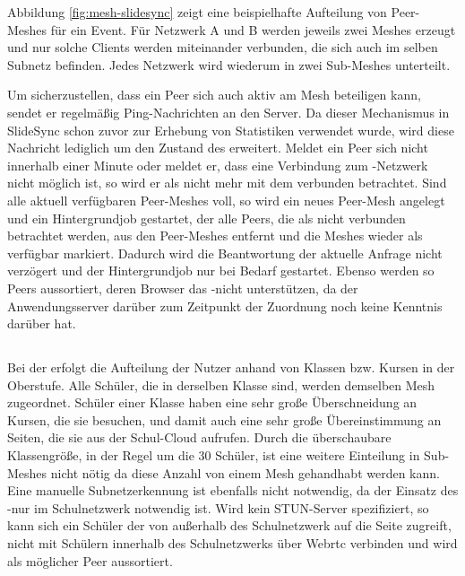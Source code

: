 Abbildung \ref{fig:mesh-slidesync} zeigt eine beispielhafte Aufteilung von Peer-Meshes für ein Event. Für Netzwerk A und B werden jeweils zwei Meshes erzeugt und nur solche Clients werden miteinander verbunden, die sich auch im selben Subnetz befinden. Jedes Netzwerk wird wiederum in zwei Sub-Meshes unterteilt.

Um sicherzustellen, dass ein Peer sich auch aktiv am Mesh beteiligen kann, sendet er regelmäßig Ping-Nachrichten an den Server. Da dieser Mechanismus in SlideSync schon zuvor zur Erhebung von Statistiken verwendet wurde, wird diese Nachricht lediglich um den Zustand des \cdns erweitert. Meldet ein Peer sich nicht innerhalb einer Minute oder meldet er, dass eine Verbindung zum \pTp-Netzwerk nicht möglich ist, so wird er als nicht mehr mit dem \pTp \cdn verbunden betrachtet. Sind alle aktuell verfügbaren Peer-Meshes voll, so wird ein neues Peer-Mesh angelegt und ein Hintergrundjob gestartet, der alle Peers, die als nicht verbunden betrachtet werden, aus den Peer-Meshes entfernt und die Meshes wieder als verfügbar markiert. Dadurch wird die Beantwortung der aktuelle Anfrage nicht verzögert und der Hintergrundjob nur bei Bedarf gestartet. Ebenso werden so Peers aussortiert, deren Browser das \pTp-\cdn nicht unterstützen, da der Anwendungsserver darüber zum Zeitpunkt der Zuordnung noch keine Kenntnis darüber hat.

\subsection{\schulCloud}
Bei der \schulCloud erfolgt die Aufteilung der Nutzer anhand von Klassen bzw. Kursen in der Oberstufe. Alle Schüler, die in derselben Klasse sind, werden demselben Mesh zugeordnet. Schüler einer Klasse haben eine sehr große Überschneidung an Kursen, die sie besuchen, und damit auch eine sehr große Übereinstimmung an Seiten, die sie aus der Schul-Cloud aufrufen. Durch die überschaubare Klassengröße, in der Regel um die 30 Schüler, ist eine weitere Einteilung in Sub-Meshes nicht nötig da diese Anzahl von einem Mesh gehandhabt werden kann. Eine manuelle Subnetzerkennung ist ebenfalls nicht notwendig, da der Einsatz des \pTp-\cdns nur im Schulnetzwerk notwendig ist. Wird kein STUN-Server spezifiziert, so kann sich ein Schüler der von außerhalb des Schulnetzwerk auf die Seite zugreift, nicht mit Schülern innerhalb des Schulnetzwerks über Webrtc verbinden und wird als möglicher Peer aussortiert.


